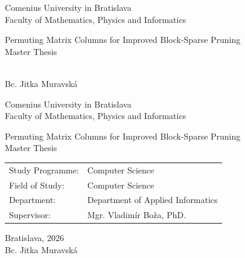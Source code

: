 \documentclass[12pt, twoside]{book}
\def\mfrok{2026}
\def\mfnazov{Permuting Matrix Columns for Improved Block-Sparse Pruning}
\def\mftyp{Master Thesis}
\def\mfautor{Bc. Jitka Muravská}
\def\mfskolitel{Mgr. Vladimír Boža, PhD.}
\def\mfmiesto{Bratislava, \mfrok}
\def\mfodbor{Computer Science}
\def\program{Computer Science }
\def\mfpracovisko{ Department of Applied Informatics }
\begin{document}
     
\frontmatter
\pagestyle{empty}


\begin{center}
  \sc\large
  Comenius University in Bratislava\\
  Faculty of Mathematics, Physics and Informatics

\vfill

{\LARGE\mfnazov}\\
\mftyp
\end{center}

\vfill

{\sc\large 
\noindent \mfrok\\
\mfautor
}

\cleardoublepage


\noindent

\begin{center}
\sc  
\large
  Comenius University in Bratislava\\
  Faculty of Mathematics, Physics and Informatics

\vfill

{\LARGE\mfnazov}\\
\mftyp
\end{center}

\vfill

\noindent
\begin{tabular}{ll}
Study Programme: & \program \\
Field of Study: & \mfodbor \\
Department: & \mfpracovisko \\
Supervisor: & \mfskolitel \\
\end{tabular}

\vfill


\noindent \mfmiesto\\
\mfautor

\cleardoublepage



\newpage
\setcounter{page}{3}

\end{document}
